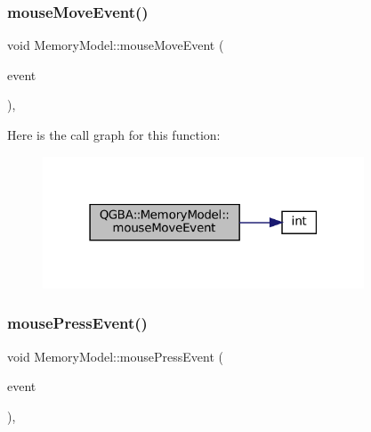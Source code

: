 \subsubsection{\texorpdfstring{mouse\+Move\+Event()}{mouseMoveEvent()}}
{\footnotesize\ttfamily void Memory\+Model\+::mouse\+Move\+Event (\begin{DoxyParamCaption}\item[{Q\+Mouse\+Event $\ast$}]{event }\end{DoxyParamCaption})\hspace{0.3cm}{\ttfamily [override]}, {\ttfamily [protected]}}

Here is the call graph for this function\+:
\nopagebreak
\begin{figure}[H]
\begin{center}
\leavevmode
\includegraphics[width=271pt]{class_q_g_b_a_1_1_memory_model_af01da9c37a2c3c20869ac0e7ed07addf_cgraph}
\end{center}
\end{figure}
\mbox{\label{class_q_g_b_a_1_1_memory_model_ab5958f08380d72823c9c0ce7e8a70937}} 
\subsubsection{\texorpdfstring{mouse\+Press\+Event()}{mousePressEvent()}}
{\footnotesize\ttfamily void Memory\+Model\+::mouse\+Press\+Event (\begin{DoxyParamCaption}\item[{Q\+Mouse\+Event $\ast$}]{event }\end{DoxyParamCaption})\hspace{0.3cm}{\ttfamily [override]}, {\ttfamily [protected]}}

